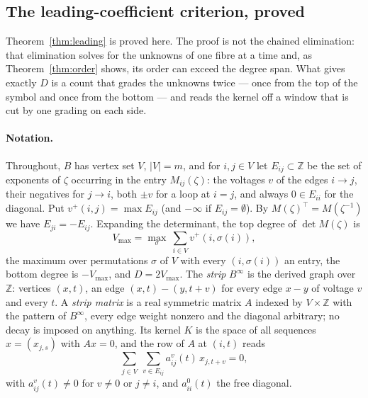 \subsection*{The leading-coefficient criterion, proved}
\label{sec:leading}

Theorem~\ref{thm:leading} is proved here. The proof is not the chained
elimination: that elimination solves for the unknowns of one fibre at a time
and, as Theorem~\ref{thm:order} shows, its order can exceed the degree span.
What gives exactly $D$ is a count that grades the unknowns twice --- once from
the top of the symbol and once from the bottom --- and reads the kernel off a
window that is cut by one grading on each side.

\paragraph{Notation.}
Throughout, $B$ has vertex set $V$, $|V|=m$, and for $i,j\in V$ let
$E_{ij}\subset\mathbb Z$ be the set of exponents of $\zeta$ occurring in the
entry $M_{ij}(\zeta)$: the voltages $v$ of the edges $i\to j$, their negatives
for $j\to i$, both $\pm v$ for a loop at $i=j$, and always $0\in E_{ii}$ for
the diagonal. Put $v^+(i,j)=\max E_{ij}$ (and $-\infty$ if $E_{ij}=\emptyset$).
By $M(\zeta)^{\!\top}=M(\zeta^{-1})$ we have $E_{ji}=-E_{ij}$. Expanding the
determinant, the top degree of $\det M(\zeta)$ is
\[
  V_{\max}=\max_{\sigma}\ \sum_{i\in V}v^+(i,\sigma(i)) ,
\]
the maximum over permutations $\sigma$ of $V$ with every $(i,\sigma(i))$ an
entry, the bottom degree is $-V_{\max}$, and $D=2V_{\max}$. The \emph{strip}
$B^{\infty}$ is the derived graph over $\mathbb Z$: vertices $(x,t)$, an edge
$(x,t)\!-\!(y,t+v)$ for every edge $x\!-\!y$ of voltage $v$ and every $t$. A
\emph{strip matrix} is a real symmetric matrix $A$ indexed by $V\times\mathbb Z$
with the pattern of $B^{\infty}$, every edge weight nonzero and the diagonal
arbitrary; no decay is imposed on anything. Its kernel $K$ is the space of all
sequences $x=(x_{j,s})$ with $Ax=0$, and the row of $A$ at $(i,t)$ reads
\begin{equation}\label{eq:striprow}
  \sum_{j\in V}\ \sum_{v\in E_{ij}} a_{ij}^{v}(t)\,x_{j,t+v}=0 ,
\end{equation}
with $a_{ij}^{v}(t)\ne0$ for $v\ne0$ or $j\ne i$, and $a_{ii}^{0}(t)$ the free
diagonal.

